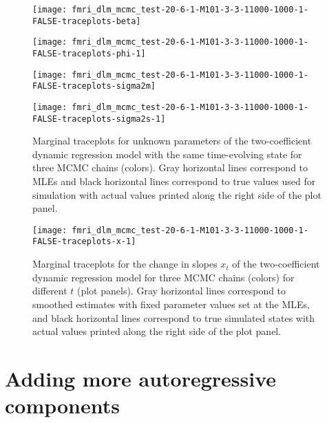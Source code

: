 \documentclass{article}
\begin{document}
\begin{figure}[ht]
\begin{minipage}{0.5\linewidth}
\texttt{[image: fmri\_dlm\_mcmc\_test-20-6-1-M101-3-3-11000-1000-1-FALSE-traceplots-beta]}
\end{minipage}
\begin{minipage}{0.5\linewidth}
\texttt{[image: fmri\_dlm\_mcmc\_test-20-6-1-M101-3-3-11000-1000-1-FALSE-traceplots-phi-1]}
\end{minipage}
\begin{minipage}{0.5\linewidth}
\texttt{[image: fmri\_dlm\_mcmc\_test-20-6-1-M101-3-3-11000-1000-1-FALSE-traceplots-sigma2m]}
\end{minipage}
\begin{minipage}{0.5\linewidth}
\texttt{[image: fmri\_dlm\_mcmc\_test-20-6-1-M101-3-3-11000-1000-1-FALSE-traceplots-sigma2s-1]}
\end{minipage}
\caption{Marginal traceplots for unknown parameters of the two-coefficient dynamic regression model with the same time-evolving state for three MCMC chains (colors). Gray horizontal lines correspond to MLEs and black horizontal lines correspond to true values used for simulation with actual values printed along the right side of the plot panel.} \label{fig:tracetheta-drext}
\end{figure}

\begin{figure}[ht]
\texttt{[image: fmri\_dlm\_mcmc\_test-20-6-1-M101-3-3-11000-1000-1-FALSE-traceplots-x-1]}
\caption{Marginal traceplots for the change in slopes $x_t$ of the two-coefficient dynamic regression model for three MCMC chains (colors) for different $t$ (plot panels). Gray horizontal lines correspond to smoothed estimates with fixed parameter values set at the MLEs, and black horizontal lines correspond to true simulated states with actual values printed along the right side of the plot panel.} \label{fig:tracex-drext}
\end{figure}

\clearpage

\section{Adding more autoregressive components} \label{sec:add}
\end{document}
